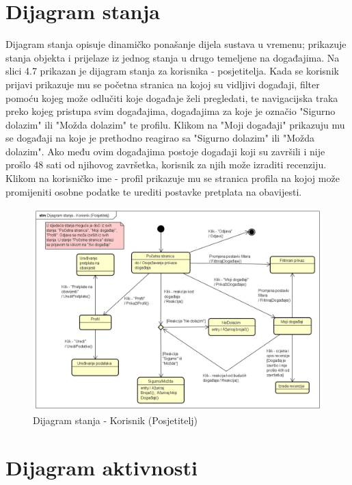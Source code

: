 			
			\eject
		
		\section{Dijagram stanja}
			
			
			Dijagram stanja opisuje dinamičko ponašanje dijela sustava u vremenu; prikazuje stanja objekta i prijelaze iz jednog stanja u drugo temeljene na događajima. Na slici 4.7 prikazan je dijagram stanja za korisnika - posjetitelja. Kada se korisnik prijavi prikazuje mu se početna stranica na kojoj su vidljivi događaji, filter pomoću kojeg može odlučiti koje događaje želi pregledati, te navigacijska traka preko kojeg pristupa svim događajima, događajima za koje je označio "Sigurno dolazim" ili "Možda dolazim" te profilu. Klikom na "Moji događaji" prikazuju mu se događaji na koje je prethodno reagirao sa "Sigurno dolazim" ili "Možda dolazim". Ako među ovim događajima postoje događaji koji su završili i nije prošlo 48 sati od njihovog završetka, korisnik za njih može izraditi recenziju. Klikom na korisničko ime - profil prikazuje mu se stranica profila na kojoj može promijeniti osobne podatke te urediti postavke pretplata na obavijesti.
			
			\begin{figure}[H]
			\includegraphics[scale=0.50]{dijagrami/DijagramStanja-Korisnik.png}
			\centering
			\caption{Dijagram stanja - Korisnik (Posjetitelj)}
			\label{fig:promjene}
			\end{figure}
			
			\eject 
		
		\section{Dijagram aktivnosti}
			
